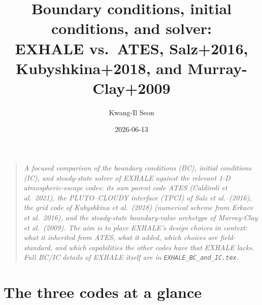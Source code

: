 \documentclass[english,a4paper]{my_memo}
\title{Boundary conditions, initial conditions, and solver:\\
EXHALE vs.\ ATES, Salz+2016,\\
Kubyshkina+2018, and Murray-Clay+2009}
\author{Kwang-Il Seon}
\date{2026-06-13}
\begin{document}
\maketitle

\begin{quote}\small\itshape
A focused comparison of the boundary conditions (BC), initial conditions
(IC), and steady-state solver of EXHALE against the
relevant 1-D atmospheric-escape codes: its own parent code ATES
(Caldiroli et al.\ 2021), the PLUTO--CLOUDY interface (TPCI) of Salz et
al.\ (2016), the grid code of Kubyshkina et al.\ (2018) (numerical
scheme from Erkaev et al.\ 2016), and the steady-state boundary-value
archetype of Murray-Clay et al.\ (2009). The aim is to place EXHALE's
design choices in context: what it inherited from ATES, what it
added, which choices are field-standard, and which capabilities the
other codes have that EXHALE lacks. Full BC/IC details
of EXHALE itself are in \texttt{EXHALE\_BC\_and\_IC.tex}.
\end{quote}

\tableofcontents

\section{The three codes at a glance}
\end{document}
